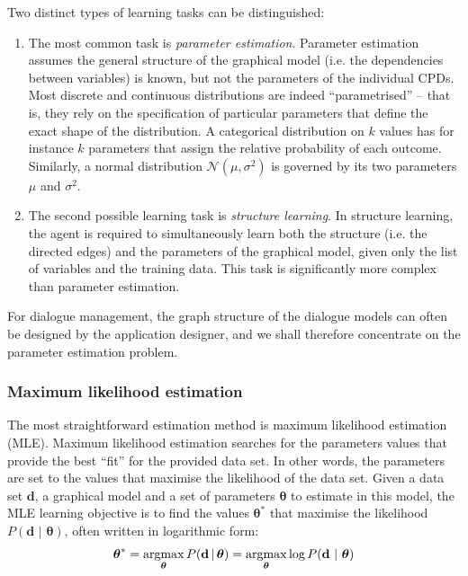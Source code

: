 Two distinct types of learning tasks can be distinguished:
\begin{enumerate}
\item The most common task is \textit{parameter estimation}.  Parameter estimation assumes the general structure of the graphical model (i.e. the dependencies between variables) is known, but not the parameters of the individual CPDs. Most discrete and continuous distributions are indeed ``parametrised'' -- that is, they rely on the specification of particular parameters that define the exact shape of the distribution. A categorical distribution on $k$ values has for instance $k$ parameters that assign the relative probability of each outcome.  Similarly, a normal distribution $\mathcal{N}(\mu,\sigma^2)$ is governed by its two parameters $\mu$ and $\sigma^2$. 

\item The second possible learning task is \textit{structure learning}.  In structure learning, the agent is required to simultaneously learn both the structure (i.e. the directed edges) and the parameters of the graphical model, given only the list of variables and the training data.  This task is significantly more complex than parameter estimation. 
\end{enumerate}

For dialogue management, the graph structure of the dialogue models can often be designed by the application designer, and we shall therefore concentrate on the parameter estimation problem. 

\subsubsection*{Maximum likelihood estimation}

The most straightforward estimation method is maximum likelihood estimation (MLE). Maximum likelihood estimation searches for the parameters values that provide the best ``fit'' for the provided data set.  In other words, the parameters are set to the values that maximise the likelihood of the data set.  Given a data set $\mathbf{d}$, a graphical model and a set of parameters $\boldsymbol\theta$ to estimate in this model, the MLE learning objective is to find the values $\boldsymbol\theta^*$  that maximise the likelihood $P(\mathbf{d} \,  \, | \,  \, \boldsymbol\theta)$, often written in logarithmic form: 
\begin{equation}
\boldsymbol\theta^* = \argmax_{\boldsymbol\theta} P(\mathbf{d}  \, | \, \boldsymbol\theta) = \argmax_{\boldsymbol\theta} \log P(\mathbf{d}  \,  \, | \,  \, \boldsymbol\theta)
\end{equation}

